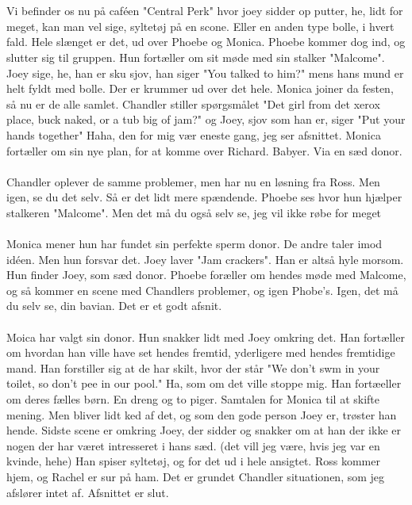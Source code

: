 \documentclass[]{article}
\begin{document}
\\ \\
Vi befinder os nu på caféen "Central Perk" hvor joey sidder op putter, he, lidt for meget, kan man vel sige, syltetøj på en scone. Eller en anden type bolle, i hvert fald. Hele slænget er det, ud over Phoebe og Monica. Phoebe kommer dog ind, og slutter sig til gruppen. Hun fortæller om sit møde med sin stalker "Malcome". Joey sige, he, han er sku sjov, han siger "You talked to him?" mens hans mund er helt fyldt med bolle. Der er krummer ud over det hele. Monica joiner da festen, så nu er de alle samlet. Chandler stiller spørgsmålet "Det girl from det xerox place, buck naked, or a tub big of jam?" og Joey, sjov som han er, siger "Put your hands together" Haha, den for mig vær eneste gang, jeg ser afsnittet. Monica fortæller om sin nye plan, for at komme over Richard. Babyer. Via en sæd donor.
\\ \\
Chandler oplever de samme problemer, men har nu en løsning fra Ross. Men igen, se du det selv. Så er det lidt mere spændende. Phoebe ses hvor hun hjælper stalkeren "Malcome". Men det må du også selv se, jeg vil ikke røbe for meget
\\ \\
Monica mener hun har fundet sin perfekte sperm donor. De andre taler imod idéen. Men hun forsvar det. Joey laver "Jam crackers". Han er altså hyle morsom. Hun finder Joey, som sæd donor. Phoebe foræller om hendes møde med Malcome, og så kommer en scene med Chandlers problemer, og igen Phobe's. Igen, det må du selv se, din bavian. Det er et godt afsnit.
\\ \\
Moica har valgt sin donor. Hun snakker lidt med Joey omkring det. Han fortæller om hvordan han ville have set hendes fremtid, yderligere med hendes fremtidige mand. Han forstiller sig at de har skilt, hvor der står "We don't swm in your toilet, so don't pee in our pool." Ha, som om det ville stoppe mig. Han fortæeller om deres fælles børn. En dreng og to piger. Samtalen for Monica til at skifte mening. Men bliver lidt ked af det, og som den gode person Joey er, trøster han hende. Sidste scene er omkring Joey, der sidder og snakker om at han der ikke er nogen der har været intresseret i hans sæd. (det vill jeg være, hvis jeg var en kvinde, hehe) Han spiser syltetøj, og for det ud i hele ansigtet. Ross kommer hjem, og Rachel er sur på ham. Det er grundet Chandler situationen, som jeg afslører intet af. Afsnittet er slut.
\end{document}
